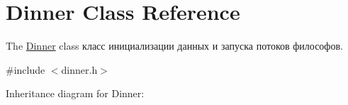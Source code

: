 \hypertarget{classDinner}{}\section{Dinner Class Reference}
\label{classDinner}


The \hyperlink{classDinner}{Dinner} class класс инициализации данных и запуска потоков философов.  




{\ttfamily \#include $<$dinner.\+h$>$}



Inheritance diagram for Dinner\+:
